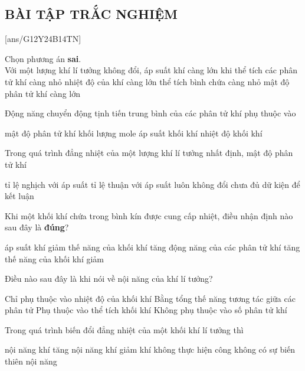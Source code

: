 \subsection{BÀI TẬP TRẮC NGHIỆM}
\setcounter{ex}{0}
[ans/G12Y24B14TN]
\begin{ex}
	Chọn phương án \textbf{sai}.\\
	Với một lượng khí lí tưởng không đổi, áp suất khí càng lớn khi
	\choice
	{\True thể tích các phân tử khí càng nhỏ}
	{nhiệt độ của khí càng lớn}
	{thể tích bình chứa càng nhỏ}
	{mật độ phân tử khí càng lớn}
	\loigiai{}
\end{ex}
\begin{ex}
	Động năng chuyển động tịnh tiến trung bình của các phân tử khí phụ thuộc vào
	
	\choice
	{mật độ phân tử khí}
	{khối lượng mole}
	{áp suất khối khí}
	{\True nhiệt độ khối khí}
	\loigiai{}
\end{ex}
\begin{ex}
Trong quá trình đẳng nhiệt của một lượng khí lí tưởng nhất định, mật độ phân tử khí 
	
	\choice
	{tỉ lệ nghịch với áp suất}
	{\True tỉ lệ thuận với áp suất}
	{luôn không đổi}
	{chưa đủ dữ kiện để kết luận}
	\loigiai{}
\end{ex}
\begin{ex}
	Khi một khối khí chứa trong bình kín được cung cấp nhiệt, điều nhận định nào sau đây là \textbf{đúng}?
	
	\choice
	{áp suất khí giảm}
	{thế năng của khối khí tăng}
	{\True động năng của các phân tử khí tăng}
	{thế năng của khối khí giảm}
	\loigiai{}
\end{ex}
\begin{ex}
	Điều nào sau đây là  khi nói về nội năng của khí lí tưởng?
	
	\choice
	{\True Chỉ phụ thuộc vào nhiệt độ của khối khí}
	{Bằng tổng thế năng tương tác giữa các phân tử}
	{Phụ thuộc vào thể tích khối khí}
	{Không phụ thuộc vào số phân tử khí}
	\loigiai{}
\end{ex}
\begin{ex}
Trong quá trình biến đổi đẳng nhiệt của một khối khí lí tưởng thì
	
	\choice
	{nội năng khí tăng}
	{nội năng khí giảm}
	{khí không thực hiện công}
	{\True không có sự biến thiên nội năng}
	\loigiai{}
\end{ex}
